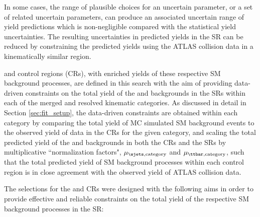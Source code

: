 In some cases, the range of plausible choices for an uncertain parameter, or a set of related uncertain parameters, can produce an associated uncertain range of yield predictions which is non-negligible compared with the statistical yield uncertainties. The resulting uncertainties in predicted yields in the SR can be reduced by constraining the predicted yields using the ATLAS collision data in a kinematically similar region. 

\wjets and \ttbar control regions (CRs), with enriched yields of these respective SM background processes, are defined in this search with the aim of providing data-driven constraints on the total yield of the \wjets and \ttbar backgrounds in the SRs within each of the merged and resolved kinematic categories. As discussed in detail in Section \ref{sec:fit_setup}, the data-driven constraints are obtained within each category by comparing the total yield of MC simulated SM background events to the observed yield of data in the CRs for the given category, and scaling the total predicted yield of the \wjets and \ttbar backgrounds in both the CRs and the SRs by multiplicative ``normalization factors", \(\mu_{\wjets, \text{category}}\) and \(\mu_{\ttbar, \text{category}}\), such that the total predicted yield of SM background processes within each control region is in close agreement with the observed yield of ATLAS collision data.

The selections for the \wjets and \ttbar CRs were designed with the following aims in order to provide effective and reliable constraints on the total yield of the respective SM background processes in the SR:

